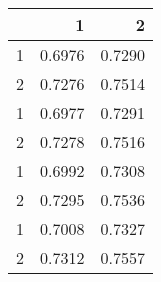 \begin{tabular}{lrr}
\toprule
{} &       1 &       2 \\
\midrule
1 &  0.6976 &  0.7290 \\
2 &  0.7276 &  0.7514 \\
1 &  0.6977 &  0.7291 \\
2 &  0.7278 &  0.7516 \\
1 &  0.6992 &  0.7308 \\
2 &  0.7295 &  0.7536 \\
1 &  0.7008 &  0.7327 \\
2 &  0.7312 &  0.7557 \\
\bottomrule
\end{tabular}
